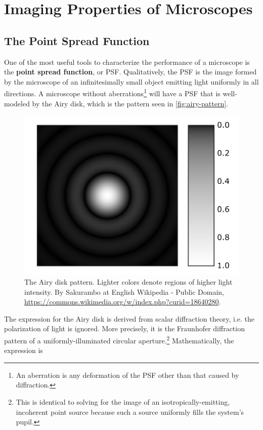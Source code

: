 \documentclass[10pt,a4paper]{book}
\begin{document}
\section{Imaging Properties of Microscopes}

\subsection{The Point Spread Function} \label{sec:psf}

One of the most useful tools to characterize the performance of a microscope is the \textbf{point spread function}, or PSF. Qualitatively, the PSF is the image formed by the microscope of an infinitesimally small object emitting light uniformly in all directions. A microscope without aberrations\footnote{An aberration is any deformation of the PSF other than that caused by diffraction.} will have a PSF that is well-modeled by the Airy disk, which is the pattern seen in \autoref{fig:airy-pattern}.

\begin{figure}[ht]
    \centering
    \includegraphics{Airy-pattern.png}
    \caption{The Airy disk pattern. Lighter colors denote regions of higher light intensity. By Sakurambo at English Wikipedia - Public Domain, \url{https://commons.wikimedia.org/w/index.php?curid=18640280}.}
    \label{fig:airy-pattern}
\end{figure}

The expression for the Airy disk is derived from scalar diffraction theory, i.e. the polarization of light is ignored. More precisely, it is the Fraunhofer diffraction pattern of a uniformly-illuminated circular aperture.\footnote{This is identical to solving for the image of an isotropically-emitting, incoherent point source because such a source uniformly fills the system's pupil.} Mathematically, the expression is
\end{document}
